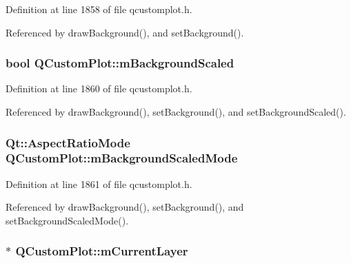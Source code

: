 Definition at line 1858 of file qcustomplot.\+h.



Referenced by draw\+Background(), and set\+Background().

\hypertarget{class_q_custom_plot_a62fe584b20680b1b2e1c7efb5c5416a5}{}
\subsubsection[{m\+Background\+Scaled}]{\setlength{\rightskip}{0pt plus 5cm}bool Q\+Custom\+Plot\+::m\+Background\+Scaled\hspace{0.3cm}{\ttfamily [protected]}}\label{class_q_custom_plot_a62fe584b20680b1b2e1c7efb5c5416a5}


Definition at line 1860 of file qcustomplot.\+h.



Referenced by draw\+Background(), set\+Background(), and set\+Background\+Scaled().

\hypertarget{class_q_custom_plot_ab82e8a5e3ad6b486f95d6da8bf49e9aa}{}
\subsubsection[{m\+Background\+Scaled\+Mode}]{\setlength{\rightskip}{0pt plus 5cm}Qt\+::\+Aspect\+Ratio\+Mode Q\+Custom\+Plot\+::m\+Background\+Scaled\+Mode\hspace{0.3cm}{\ttfamily [protected]}}\label{class_q_custom_plot_ab82e8a5e3ad6b486f95d6da8bf49e9aa}


Definition at line 1861 of file qcustomplot.\+h.



Referenced by draw\+Background(), set\+Background(), and set\+Background\+Scaled\+Mode().

\hypertarget{class_q_custom_plot_aa27569c92e74395af10151357d268628}{}
\subsubsection[{m\+Current\+Layer}]{$\ast$ Q\+Custom\+Plot\+::m\+Current\+Layer\hspace{0.3cm}{\ttfamily [protected]}}\label{class_q_custom_plot_aa27569c92e74395af10151357d268628}



